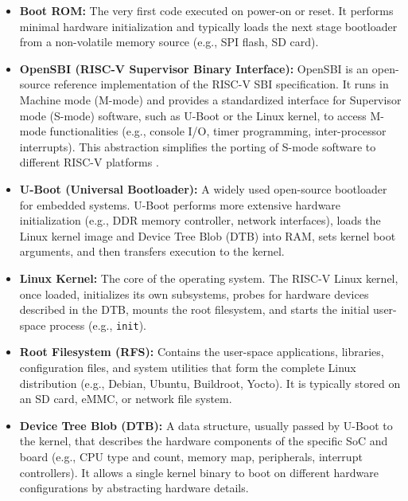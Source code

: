 \begin{itemize}
    \item \textbf{Boot ROM:} The very first code executed on power-on or reset. It performs minimal hardware initialization and typically loads the next stage bootloader from a non-volatile memory source (e.g., SPI flash, SD card).
    \item \textbf{OpenSBI (RISC-V Supervisor Binary Interface):} OpenSBI is an open-source reference implementation of the RISC-V SBI specification. It runs in Machine mode (M-mode) and provides a standardized interface for Supervisor mode (S-mode) software, such as U-Boot or the Linux kernel, to access M-mode functionalities (e.g., console I/O, timer programming, inter-processor interrupts). This abstraction simplifies the porting of S-mode software to different RISC-V platforms \cite{opensbi_project}.
    \item \textbf{U-Boot (Universal Bootloader):} A widely used open-source bootloader for embedded systems. U-Boot performs more extensive hardware initialization (e.g., DDR memory controller, network interfaces), loads the Linux kernel image and Device Tree Blob (DTB) into RAM, sets kernel boot arguments, and then transfers execution to the kernel.
    \item \textbf{Linux Kernel:} The core of the operating system. The RISC-V Linux kernel, once loaded, initializes its own subsystems, probes for hardware devices described in the DTB, mounts the root filesystem, and starts the initial user-space process (e.g., \texttt{init}).
    \item \textbf{Root Filesystem (RFS):} Contains the user-space applications, libraries, configuration files, and system utilities that form the complete Linux distribution (e.g., Debian, Ubuntu, Buildroot, Yocto). It is typically stored on an SD card, eMMC, or network file system.
    \item \textbf{Device Tree Blob (DTB):} A data structure, usually passed by U-Boot to the kernel, that describes the hardware components of the specific SoC and board (e.g., CPU type and count, memory map, peripherals, interrupt controllers). It allows a single kernel binary to boot on different hardware configurations by abstracting hardware details.
\end{itemize}

